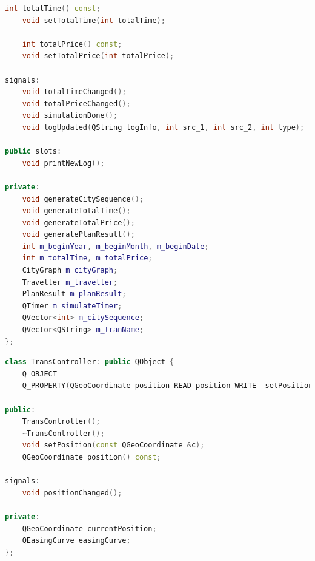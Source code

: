 \documentclass[lang=cn,blue,13pt]{elegantbook}
\begin{document}
\begin{lstlisting}[language=C++,caption={GraphHandler 的定义},captionpos=b]
	int totalTime() const;
	void setTotalTime(int totalTime);

	int totalPrice() const;
	void setTotalPrice(int totalPrice);

signals:
	void totalTimeChanged();
	void totalPriceChanged();
	void simulationDone();
	void logUpdated(QString logInfo, int src_1, int src_2, int type);

public slots:
	void printNewLog();

private:
	void generateCitySequence();
	void generateTotalTime();
	void generateTotalPrice();
	void generatePlanResult();
	int m_beginYear, m_beginMonth, m_beginDate;
	int m_totalTime, m_totalPrice;
	CityGraph m_cityGraph;
	Traveller m_traveller;
	PlanResult m_planResult;
	QTimer m_simulateTimer;
	QVector<int> m_citySequence;
	QVector<QString> m_tranName;
};
\end{lstlisting}

\begin{lstlisting}[language=C++,caption={TransController 的定义},captionpos=b]
class TransController: public QObject {
  	Q_OBJECT
  	Q_PROPERTY(QGeoCoordinate position READ position WRITE 	setPosition NOTIFY positionChanged)

public:
	TransController();
	~TransController();
	void setPosition(const QGeoCoordinate &c);
	QGeoCoordinate position() const;

signals:
	void positionChanged();

private:
	QGeoCoordinate currentPosition;
	QEasingCurve easingCurve;
};
\end{lstlisting}
\end{document}

